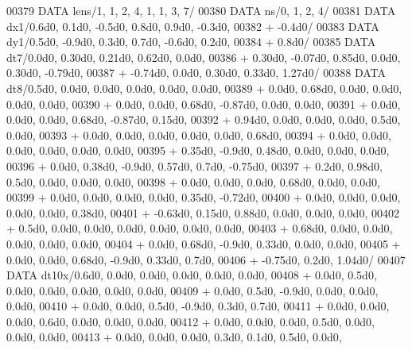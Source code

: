\begin{DoxyCode}
00379       \textcolor{keyword}{DATA}              lens/1, 1, 2, 4, 1, 1, 3, 7/
00380       \textcolor{keyword}{DATA}              ns/0, 1, 2, 4/
00381       \textcolor{keyword}{DATA}              dx1/0.6d0, 0.1d0, -0.5d0, 0.8d0, 0.9d0, -0.3d0,
00382      +                  -0.4d0/
00383       \textcolor{keyword}{DATA}              dy1/0.5d0, -0.9d0, 0.3d0, 0.7d0, -0.6d0, 0.2d0,
00384      +                  0.8d0/
00385       \textcolor{keyword}{DATA}              dt7/0.0d0, 0.30d0, 0.21d0, 0.62d0, 0.0d0,
00386      +                  0.30d0, -0.07d0, 0.85d0, 0.0d0, 0.30d0, -0.79d0,
00387      +                  -0.74d0, 0.0d0, 0.30d0, 0.33d0, 1.27d0/
00388       \textcolor{keyword}{DATA}              dt8/0.5d0, 0.0d0, 0.0d0, 0.0d0, 0.0d0, 0.0d0,
00389      +                  0.0d0, 0.68d0, 0.0d0, 0.0d0, 0.0d0, 0.0d0,
00390      +                  0.0d0, 0.0d0, 0.68d0, -0.87d0, 0.0d0, 0.0d0,
00391      +                  0.0d0, 0.0d0, 0.0d0, 0.68d0, -0.87d0, 0.15d0,
00392      +                  0.94d0, 0.0d0, 0.0d0, 0.0d0, 0.5d0, 0.0d0,
00393      +                  0.0d0, 0.0d0, 0.0d0, 0.0d0, 0.0d0, 0.68d0,
00394      +                  0.0d0, 0.0d0, 0.0d0, 0.0d0, 0.0d0, 0.0d0,
00395      +                  0.35d0, -0.9d0, 0.48d0, 0.0d0, 0.0d0, 0.0d0,
00396      +                  0.0d0, 0.38d0, -0.9d0, 0.57d0, 0.7d0, -0.75d0,
00397      +                  0.2d0, 0.98d0, 0.5d0, 0.0d0, 0.0d0, 0.0d0,
00398      +                  0.0d0, 0.0d0, 0.0d0, 0.68d0, 0.0d0, 0.0d0,
00399      +                  0.0d0, 0.0d0, 0.0d0, 0.0d0, 0.35d0, -0.72d0,
00400      +                  0.0d0, 0.0d0, 0.0d0, 0.0d0, 0.0d0, 0.38d0,
00401      +                  -0.63d0, 0.15d0, 0.88d0, 0.0d0, 0.0d0, 0.0d0,
00402      +                  0.5d0, 0.0d0, 0.0d0, 0.0d0, 0.0d0, 0.0d0, 0.0d0,
00403      +                  0.68d0, 0.0d0, 0.0d0, 0.0d0, 0.0d0, 0.0d0,
00404      +                  0.0d0, 0.68d0, -0.9d0, 0.33d0, 0.0d0, 0.0d0,
00405      +                  0.0d0, 0.0d0, 0.68d0, -0.9d0, 0.33d0, 0.7d0,
00406      +                  -0.75d0, 0.2d0, 1.04d0/
00407       \textcolor{keyword}{DATA}              dt10x/0.6d0, 0.0d0, 0.0d0, 0.0d0, 0.0d0, 0.0d0,
00408      +                  0.0d0, 0.5d0, 0.0d0, 0.0d0, 0.0d0, 0.0d0, 0.0d0,
00409      +                  0.0d0, 0.5d0, -0.9d0, 0.0d0, 0.0d0, 0.0d0,
00410      +                  0.0d0, 0.0d0, 0.5d0, -0.9d0, 0.3d0, 0.7d0,
00411      +                  0.0d0, 0.0d0, 0.0d0, 0.6d0, 0.0d0, 0.0d0, 0.0d0,
00412      +                  0.0d0, 0.0d0, 0.0d0, 0.5d0, 0.0d0, 0.0d0, 0.0d0,
00413      +                  0.0d0, 0.0d0, 0.0d0, 0.3d0, 0.1d0, 0.5d0, 0.0d0,

\end{DoxyCode}
